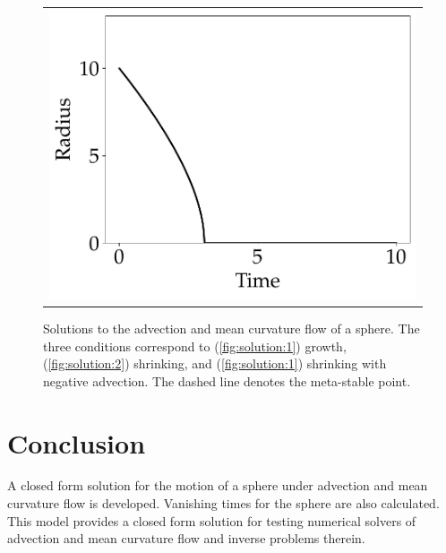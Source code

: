 \documentclass[journal]{IEEEtran}
\begin{document}
\begin{figure}[t]
\begin{tabular}{c}
{      \includegraphics[width=0.85\linewidth]{solution_3}%
      \label{fig:solution:3}
    }
  \end{tabular}
  \caption{Solutions to the advection and mean curvature flow of a sphere. The three conditions correspond to (\ref{fig:solution:1}) growth, (\ref{fig:solution:2}) shrinking, and (\ref{fig:solution:1}) shrinking with negative advection. The dashed line denotes the meta-stable point.}
  \label{fig:solution}
\end{figure}

\section{Conclusion}
A closed form solution for the motion of a sphere under advection and mean curvature flow is developed.
Vanishing times for the sphere are also calculated.
This model provides a closed form solution for testing numerical solvers of advection and mean curvature flow and inverse problems therein.


%
\end{document}
